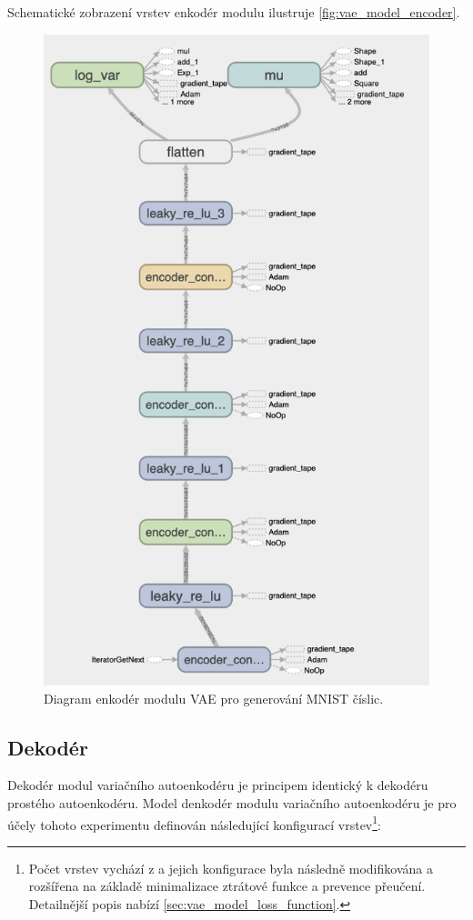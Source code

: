 Schematické zobrazení vrstev enkodér modulu ilustruje \autoref{fig:vae_model_encoder}.
\begin{figure}[H]
    \centering
    \includegraphics[height=0.63\textheight]{figures/vae_model_encoder.png}
    \caption{Diagram enkodér modulu VAE pro generování MNIST číslic.}
    \label{fig:vae_model_encoder}
\end{figure}

\subsection{Dekodér}
\label{sec:vae_model_decoder}
Dekodér modul variačního autoenkodéru je principem identický k dekodéru prostého autoenkodéru.
Model denkodér modulu variačního autoenkodéru je pro účely tohoto experimentu definován následující konfigurací vrstev\footnote{Počet vrstev vychází z \textcite{Kingma2014} a jejich konfigurace byla následně modifikována a rozšířena na základě minimalizace ztrátové funkce a prevence přeučení. Detailnější popis nabízí \autoref{sec:vae_model_loss_function}.}:

